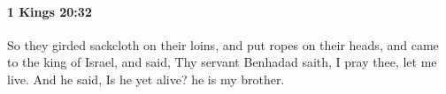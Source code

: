 
		\paragraph{1 Kings 20:32} %
			\label{1KINGS-20-32}

			So they girded sackcloth on their loins, and put ropes on their heads, and came to the king of Israel, and said, Thy servant Benhadad saith, I pray thee, let me live. And he said, Is he yet alive? he is my brother.


